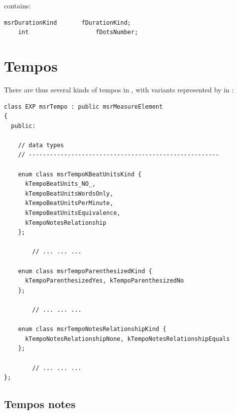  contains:
\begin{lstlisting}[language=CPlusPlus]
    msrDurationKind       fDurationKind;
    int                   fDotsNumber;
\end{lstlisting}


\section{Tempos}\label{Tempos}

There are thus several kinds of tempos in \msrRepr, with variants represented by  in :
\begin{lstlisting}[language=CPlusPlus]
class EXP msrTempo : public msrMeasureElement
{
  public:

    // data types
    // ------------------------------------------------------

    enum class msrTempoKBeatUnitsKind {
      kTempoBeatUnits_NO_,
      kTempoBeatUnitsWordsOnly,
      kTempoBeatUnitsPerMinute,
      kTempoBeatUnitsEquivalence,
      kTempoNotesRelationship
    };

		// ... ... ...

    enum class msrTempoParenthesizedKind {
      kTempoParenthesizedYes, kTempoParenthesizedNo
    };

		// ... ... ...

    enum class msrTempoNotesRelationshipKind {
      kTempoNotesRelationshipNone, kTempoNotesRelationshipEquals
    };

		// ... ... ...
};
\end{lstlisting}


\subsection{Tempos notes}\label{Tempos notes}

